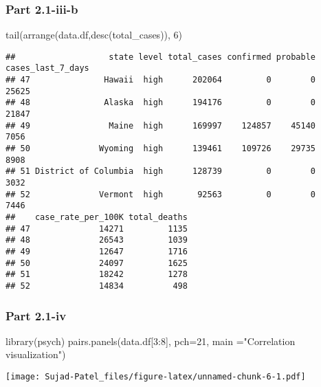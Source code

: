 \documentclass[
]{article}
\newenvironment{Shaded}{\begin{snugshade}}{\end{snugshade}}
\newcommand{\AttributeTok}[1]{\textcolor[rgb]{0.77,0.63,0.00}{#1}}
\newcommand{\DecValTok}[1]{\textcolor[rgb]{0.00,0.00,0.81}{#1}}
\newcommand{\FunctionTok}[1]{\textcolor[rgb]{0.00,0.00,0.00}{#1}}
\newcommand{\NormalTok}[1]{#1}
\newcommand{\SpecialCharTok}[1]{\textcolor[rgb]{0.00,0.00,0.00}{#1}}
\newcommand{\StringTok}[1]{\textcolor[rgb]{0.31,0.60,0.02}{#1}}
\begin{document}
\hypertarget{part-2.1-iii-b}{%
\subsubsection{Part 2.1-iii-b}\label{part-2.1-iii-b}}

\begin{Shaded}
\begin{Highlighting}[]
\FunctionTok{tail}\NormalTok{(}\FunctionTok{arrange}\NormalTok{(data.df,}\FunctionTok{desc}\NormalTok{(total\_cases)), }\DecValTok{6}\NormalTok{)}
\end{Highlighting}
\end{Shaded}

\begin{verbatim}
##                   state level total_cases confirmed probable cases_last_7_days
## 47               Hawaii  high      202064         0        0             25625
## 48               Alaska  high      194176         0        0             21847
## 49                Maine  high      169997    124857    45140              7056
## 50              Wyoming  high      139461    109726    29735              8908
## 51 District of Columbia  high      128739         0        0              3032
## 52              Vermont  high       92563         0        0              7446
##    case_rate_per_100K total_deaths
## 47              14271         1135
## 48              26543         1039
## 49              12647         1716
## 50              24097         1625
## 51              18242         1278
## 52              14834          498
\end{verbatim}

\hypertarget{part-2.1-iv}{%
\subsubsection{Part 2.1-iv}\label{part-2.1-iv}}

\begin{Shaded}
\begin{Highlighting}[]
\FunctionTok{library}\NormalTok{(psych)}
\FunctionTok{pairs.panels}\NormalTok{(data.df[}\DecValTok{3}\SpecialCharTok{:}\DecValTok{8}\NormalTok{], }\AttributeTok{pch=}\DecValTok{21}\NormalTok{, }\AttributeTok{main =}\StringTok{"Correlation visualization"}\NormalTok{)}
\end{Highlighting}
\end{Shaded}

\texttt{[image: Sujad-Patel\_files/figure-latex/unnamed-chunk-6-1.pdf]}
\end{document}
